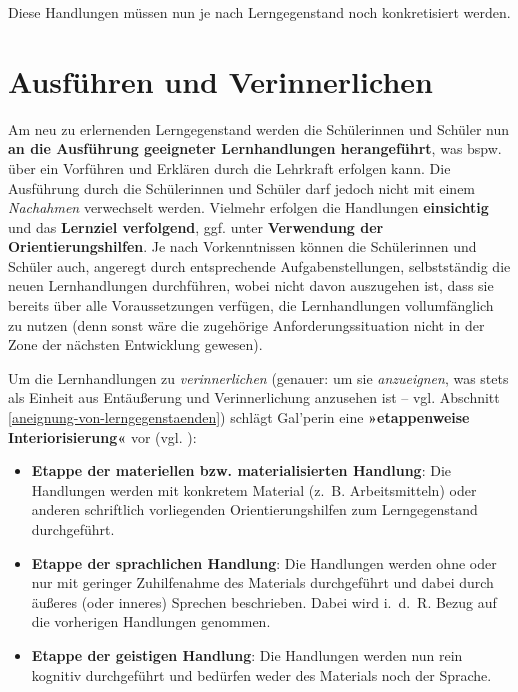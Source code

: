 \documentclass[
]{scrbook}
\theoremstyle{definition}
\theoremstyle{definition}
\theoremstyle{definition}
\theoremstyle{definition}
\theoremstyle{remark}
\begin{document}
Diese Handlungen müssen nun je nach Lerngegenstand noch konkretisiert werden.

\section{Ausführen und Verinnerlichen}\label{ausfuehren-und-verinnerlichen}

Am neu zu erlernenden Lerngegenstand werden die Schülerinnen und Schüler nun \textbf{an die Ausführung geeigneter Lernhandlungen herangeführt}, was bspw. über ein Vorführen und Erklären durch die Lehrkraft erfolgen kann. Die Ausführung durch die Schülerinnen und Schüler darf jedoch nicht mit einem \emph{Nachahmen} verwechselt werden. Vielmehr erfolgen die Handlungen \textbf{einsichtig} und das \textbf{Lernziel verfolgend}, ggf. unter \textbf{Verwendung der Orientierungshilfen}. Je nach Vorkenntnissen können die Schülerinnen und Schüler auch, angeregt durch entsprechende Aufgabenstellungen, selbstständig die neuen Lernhandlungen durchführen, wobei nicht davon auszugehen ist, dass sie bereits über alle Voraussetzungen verfügen, die Lernhandlungen vollumfänglich zu nutzen (denn sonst wäre die zugehörige Anforderungssituation nicht in der Zone der nächsten Entwicklung gewesen).

Um die Lernhandlungen zu \emph{verinnerlichen} (genauer: um sie \emph{anzueignen}, was stets als Einheit aus Entäußerung und Verinnerlichung anzusehen ist -- vgl. Abschnitt \ref{aneignung-von-lerngegenstaenden}) schlägt Gal'perin eine \textbf{»etappenweise Interiorisierung«} vor (vgl. ):

\begin{itemize}
\item
  \textbf{Etappe der materiellen bzw. materialisierten Handlung}: Die Handlungen werden mit konkretem Material (z.~B. Arbeitsmitteln) oder anderen schriftlich vorliegenden Orientierungshilfen zum Lerngegenstand durchgeführt.
\item
  \textbf{Etappe der sprachlichen Handlung}: Die Handlungen werden ohne oder nur mit geringer Zuhilfenahme des Materials durchgeführt und dabei durch äußeres (oder inneres) Sprechen beschrieben. Dabei wird i.~d.~R. Bezug auf die vorherigen Handlungen genommen.
\item
  \textbf{Etappe der geistigen Handlung}: Die Handlungen werden nun rein kognitiv durchgeführt und bedürfen weder des Materials noch der Sprache.
\end{itemize}
\end{document}
